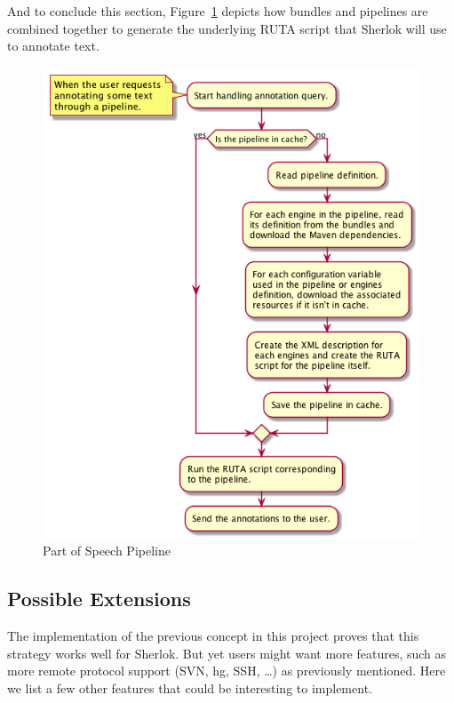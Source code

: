 \documentclass{article}
\begin{document}
And to conclude this section, Figure~\ref{fig:sherlok_load_pipeline} depicts how bundles and pipelines
are combined together to generate the underlying RUTA script that Sherlok will use to annotate text.

\begin{figure}
    \centering
    \includegraphics[width=\linewidth]{res/sherlok_load_pipeline.png}
    \caption{Part of Speech Pipeline}
    \label{fig:sherlok_load_pipeline}
\end{figure}

\subsection{Possible Extensions}

The implementation of the previous concept in this project proves that this strategy works well for
Sherlok. But yet users might want more features, such as more remote protocol support (SVN, hg, SSH,
\dots) as previously mentioned. Here we list a few other features that could be interesting to
implement.
\end{document}
